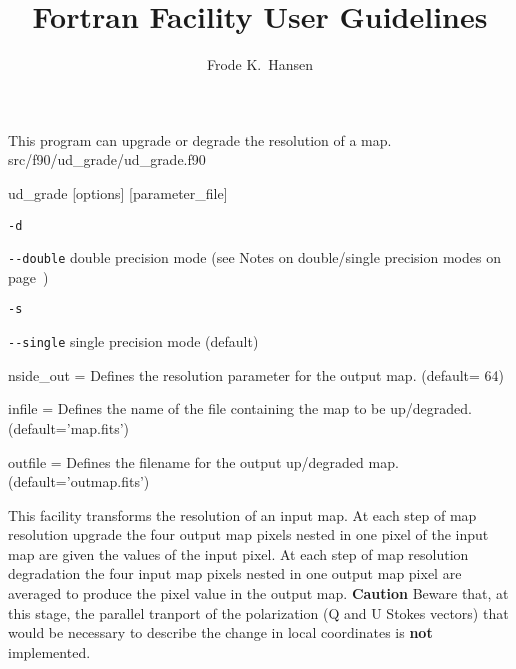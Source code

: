 
\sloppy


\title{\healpix Fortran Facility User Guidelines}
 \section[ud\_grade]{\nosectionname}
\label{fac:ud_grade}
\author{Frode K.~Hansen}

\begin{facility}
{This program can upgrade or degrade the resolution of a \healpix map.} 
{src/f90/ud\_grade/ud\_grade.f90}
\end{facility}

\begin{f90facility}
{ud\_grade [options] [parameter\_file]}
\end{f90facility}

\begin{options}
  \begin{optionlistwide}{} %
    \item[{\tt -d}]
    \item[{\tt -}{\tt -}{\tt double}] double precision mode (see Notes on double/single precision modes on page~\pageref{page:ioprec})
    \item[{\tt -s}]
    \item[{\tt -}{\tt -}{\tt single}] single precision mode (default)
  \end{optionlistwide}
\end{options}

\begin{qualifiers}
  \begin{qulist}{} %
    \item[{nside\_out = }]%
 Defines the resolution parameter for the output map. 
	(default= 64)
\item[{infile = }]%
 Defines the name of the file containing the map to be 
up/degraded.
(default='map.fits')
\item[{outfile = }]%
 Defines the filename for the output up/degraded map.
(default='outmap.fits')
  \end{qulist}
\end{qualifiers}

\begin{codedescription}
{
This facility transforms the resolution of an input \healpix map.
At each step of map resolution upgrade the four output map pixels nested 
in  one pixel of 
the input map are given  the values of the input pixel. 
At each step of map resolution degradation
the four input map pixels nested in one output map pixel
are averaged to produce the pixel
value in the output map.
{\bf Caution} Beware that, at this stage, the parallel tranport of the polarization
(Q and U Stokes vectors) that would be necessary to describe the change
in local coordinates is {\bf not} implemented.
}
\end{codedescription}

